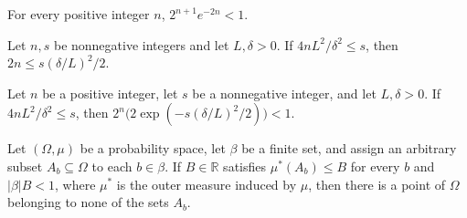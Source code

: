 \begin{theorem}
\leanok
{}
For every positive integer $n$, $2^{n+1}e^{-2n}<1$.
\end{theorem}

\begin{theorem}
\leanok
{}
Let $n,s$ be nonnegative integers and let $L,\delta>0$. If $4nL^2/\delta^2\le s$, then
$2n\le s(\delta/L)^2/2$.
\end{theorem}

\begin{theorem}
\leanok
{}
Let $n$ be a positive integer, let $s$ be a nonnegative integer, and let $L,\delta>0$.
If $4nL^2/\delta^2\le s$, then $2^n\bigl(2\exp(-s(\delta/L)^2/2)\bigr)<1$.
\end{theorem}

\begin{theorem}
\leanok
{}
Let $(\Omega,\mu)$ be a probability space, let $\beta$ be a finite set, and assign an
arbitrary subset $A_b\subseteq\Omega$ to each $b\in\beta$. If $B\in\mathbb R$ satisfies
$\mu^*(A_b)\le B$ for every $b$ and $|\beta|B<1$, where $\mu^*$ is the outer measure
induced by $\mu$, then there is a point of $\Omega$ belonging to none of the sets $A_b$.
\end{theorem}

